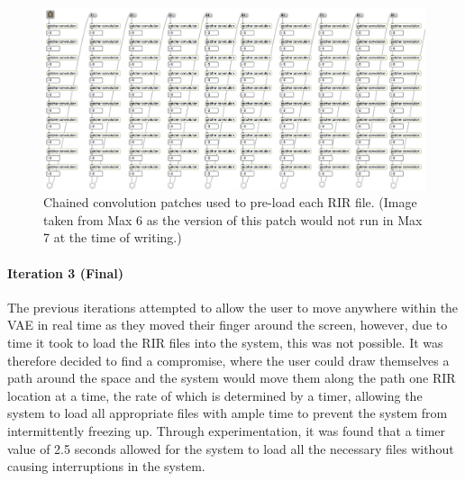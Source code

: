 \documentclass[../../main.tex]{subfiles}
\begin{document}
			\begin{figure}
				\centerline{\includegraphics[width=\textwidth]{Sections/Implementation/Max/images/Max/Iteration2/preload.png}}
				\caption{Chained convolution patches used to pre-load each \ac{RIR} file. (Image taken from Max 6 as the version of this patch would not run in Max 7 at the time of writing.)}
				\label{preload}
			\end{figure}


		 \paragraph{Iteration 3 (Final)}
		 \label{iteration3}

		 	The previous iterations attempted to allow the user to move anywhere within the \ac{VAE} in real time as they moved their finger around the screen, however, due to time it took to load the \ac{RIR} files into the system, this was not possible. It was therefore decided to find a compromise, where the user could draw themselves a path around the space and the system would move them along the path one \ac{RIR} location at a time, the rate of which is determined by a timer, allowing the system to load all appropriate files with ample time to prevent the system from intermittently freezing up. Through experimentation, it was found that a timer value of 2.5 seconds allowed for the system to load all the necessary files without causing interruptions in the system.
\end{document}
